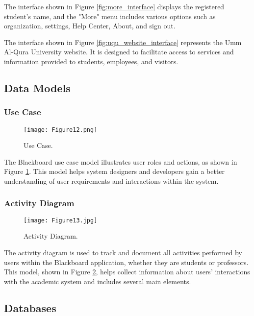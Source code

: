 \documentclass[a4paper,12pt]{article}
\begin{document}
The interface shown in Figure \ref{fig:more_interface} displays the registered student's name, and the "More" menu includes various options such as organization, settings, Help Center, About, and sign out.\newline

The interface shown in Figure \ref{fig:uqu_website_interface} represents the Umm Al-Qura University website. It is designed to facilitate access to services and information provided to students, employees, and visitors.

\newpage

\subsection{Data Models}

\subsubsection{Use Case}

\begin{figure}[h!]
    \centering
    \texttt{[image: Figure12.png]} 
    \caption{Use Case.}
    \label{fig:use_case}
\end{figure}

The Blackboard use case model illustrates user roles and actions, as shown in Figure \ref{fig:use_case}. This model helps system designers and developers gain a better understanding of user requirements and interactions within the system.
 \newpage
 
\subsubsection{Activity Diagram}

\begin{figure}[h!]
    \centering
    \texttt{[image: Figure13.jpg]} %
    \caption{Activity Diagram.}
    \label{fig:activity_diagram}
\end{figure}

The activity diagram is used to track and document all activities performed by
users within the Blackboard application, whether they are students or professors. This model, shown in Figure \ref{fig:activity_diagram}, helps collect information about users’ interactions
with the academic system and includes several main elements.

\newpage

\subsection{Databases}
\end{document}
